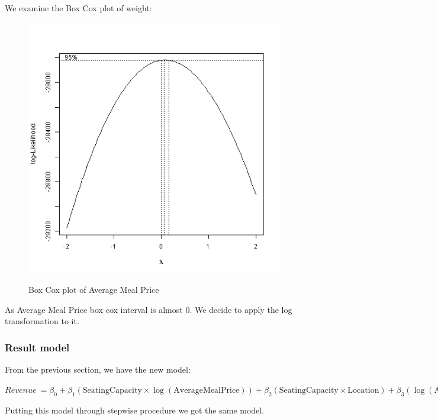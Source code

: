 We examine the Box Cox plot of weight:

\begin{figure}[H]
\centering
\includegraphics[scale=0.4]{img/Averboxcox.png}
\label{fig:my_label_with_H}
\caption{Box Cox plot of Average Meal Price}
\end{figure}

As Average Meal Price box cox interval is almost 0. We decide to apply the log transformation to it.

\subsubsection{Result model}

From the previous section, we have the new model:
\begin{center}
$
Revenue \ = \beta_0 + \beta_1 \left(\text{SeatingCapacity} \times \log(\text{AverageMealPrice})\right) + \beta_2 \left(\text{SeatingCapacity} \times \text{Location}\right) + \beta_3 \left(\log(\text{AverageMealPrice}) \times \text{Cuisine}\right) + \beta_4 \sqrt{\text{WeekdayReservations}} + \beta_5 \sqrt{\text{WeekendReservations}} + \epsilon
$
\end{center}

Putting this model through stepwise procedure we got the same model.

